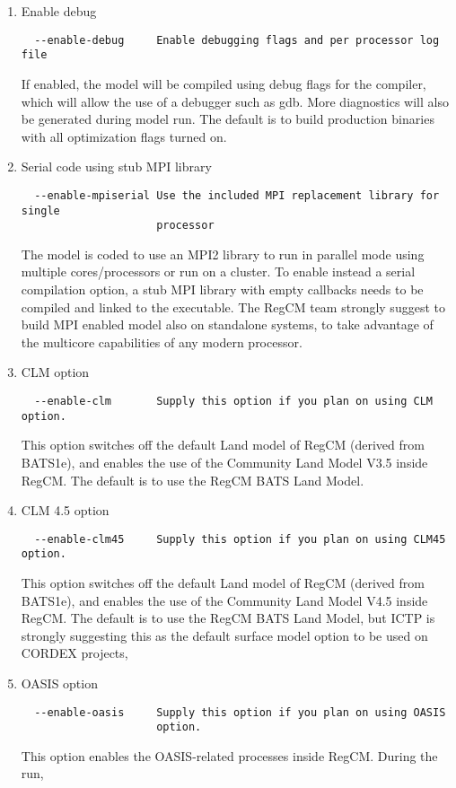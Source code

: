 \begin{enumerate}
\item Enable debug
\begin{Verbatim}
  --enable-debug     Enable debugging flags and per processor log file
\end{Verbatim}
If enabled, the model will be compiled using debug flags for the compiler,
which will allow the use of a debugger such as gdb. More diagnostics will
also be generated during model run.
The default is to build production binaries with all optimization flags
turned on.

\item Serial code using stub MPI library
\begin{Verbatim}
  --enable-mpiserial Use the included MPI replacement library for single
                     processor
\end{Verbatim}
The model is coded to use an MPI2 library to run in parallel mode using
multiple cores/processors or run on a cluster. To enable instead a serial
compilation option, a stub MPI library with empty callbacks needs to be
compiled and linked to the executable.
The RegCM team strongly suggest to build MPI enabled model also on standalone
systems, to take advantage of the multicore capabilities of any modern
processor.
\item CLM option
\begin{Verbatim}
  --enable-clm       Supply this option if you plan on using CLM option.
\end{Verbatim}
This option switches off the default Land model of RegCM (derived from BATS1e),
and enables the use of the Community Land Model V3.5 inside RegCM. The default
is to use the RegCM BATS Land Model.
\item CLM 4.5 option
\begin{Verbatim}
  --enable-clm45     Supply this option if you plan on using CLM45 option.
\end{Verbatim}
This option switches off the default Land model of RegCM (derived from BATS1e),
and enables the use of the Community Land Model V4.5 inside RegCM. The default
is to use the RegCM BATS Land Model, but ICTP is strongly suggesting this as
the default surface model option to be used on CORDEX projects,
\item OASIS option
\begin{verbatim}
  --enable-oasis     Supply this option if you plan on using OASIS
                     option.
\end{verbatim}
This option enables the OASIS-related processes inside RegCM. During the run,

\end{enumerate}

